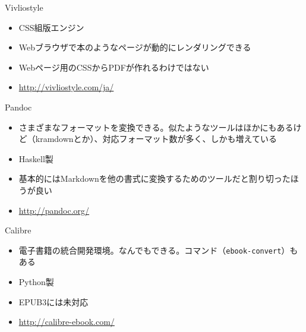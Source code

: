 \begin{frame}[containsverbatim, t]{\inhibitglue Vivliostyle}
  \sffamily
  
  \begin{itemize}
    \item CSS組版エンジン
    \item Webブラウザで本のようなページが動的にレンダリングできる
    \item Webページ用のCSSからPDFが作れるわけではない
    \item \url{http://vivliostyle.com/ja/}
  \end{itemize}

\end{frame}

%  
%

\begin{frame}[containsverbatim, t]{\inhibitglue Pandoc}
  \sffamily
  
  \begin{itemize}
    \item さまざまなフォーマットを変換できる。似たようなツールはほかにもあるけど（kramdownとか）、対応フォーマット数が多く、しかも増えている
    \item Haskell製
    \item 基本的にはMarkdownを他の書式に変換するためのツールだと割り切ったほうが良い
    \item \url{http://pandoc.org/}
  \end{itemize}

\end{frame}

\begin{frame}[containsverbatim, t]{\inhibitglue Calibre}
  \sffamily
  
  \begin{itemize}
    \item 電子書籍の統合開発環境。なんでもできる。コマンド（\texttt{ebook-convert}）もある
    \item Python製
    \item EPUB3には未対応
    \item \url{http://calibre-ebook.com/}
  \end{itemize}

\end{frame}

